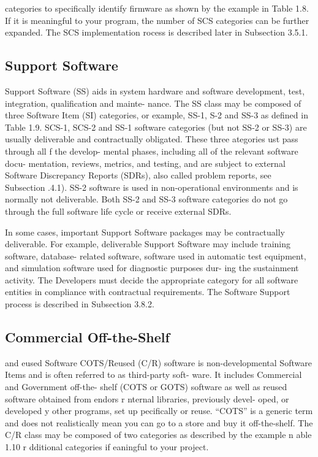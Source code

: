 \documentclass{book}
\begin{document}
\begin{multicols}{2}
	
categories to specifically identify firmware as shown by the
example in Table 1.8. If it is meaningful to your program,
the number of SCS categories can be further expanded. The
SCS implementation rocess is described later in Subsection
3.5.1.

\subsection{Support Software}
Support Software (SS) aids in system hardware and software
development, test, integration, qualification and mainte-
nance. The SS class may be composed of three Software Item
(SI) categories, or example, SS-1, S-2 and SS-3 as defined
in Table 1.9.
SCS-1, SCS-2 and SS-1 software categories (but not SS-2
or SS-3) are usually deliverable and contractually obligated.
These three ategories ust pass through all f the develop-
mental phases, including all of the relevant software docu-
mentation, reviews, metrics, and testing, and are subject to
external Software Discrepancy Reports (SDRs), also called
problem reports, see Subsection .4.1).
SS-2 software is used in non-operational environments
and is normally not deliverable. Both SS-2 and SS-3 software
categories do not go through the full software life cycle or
receive external SDRs.

In some cases, important Support Software packages
may be contractually deliverable. For example, deliverable
Support Software may include training software, database-
related software, software used in automatic test equipment,
and simulation software used for diagnostic purposes dur-
ing the sustainment activity. The Developers must decide the
appropriate category for all software entities in compliance
with contractual requirements. The Software Support process
is described in Subsection 3.8.2.

\subsection{Commercial Off-the-Shelf}
and eused Software
COTS/Reused (C/R) software is non-developmental
Software Items and is often referred to as third-party soft-
ware. It includes Commercial and Government off-the-
shelf (COTS or GOTS) software as well as reused software
obtained from endors r nternal libraries, previously devel-
oped, or developed y other programs, set up pecifically or
reuse. “COTS” is a generic term and does not realistically
mean you can go to a store and buy it off-the-shelf. The C/R
class may be composed of two categories as described by the
example n able 1.10 r dditional categories if eaningful
to your project.


\end{multicols}
\end{document}
